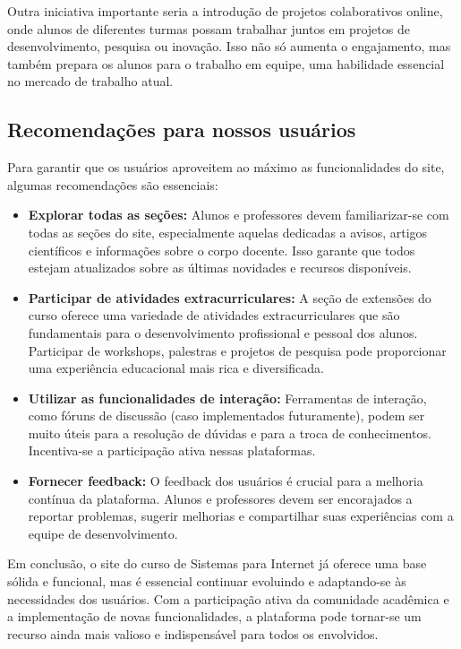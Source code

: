 \documentclass[a4paper,12pt]{report}
\begin{document}
Outra iniciativa importante seria a introdução de projetos colaborativos online, onde alunos de diferentes turmas possam trabalhar juntos em projetos de desenvolvimento, pesquisa ou inovação. Isso não só aumenta o engajamento, mas também prepara os alunos para o trabalho em equipe, uma habilidade essencial no mercado de trabalho atual. 

\subsection{Recomendações para nossos usuários} 
Para garantir que os usuários aproveitem ao máximo as funcionalidades do site, algumas recomendações são essenciais: 

\begin{itemize} 

    \item \textbf{Explorar todas as seções:} Alunos e professores devem familiarizar-se com todas as seções do site, especialmente aquelas dedicadas a avisos, artigos científicos e informações sobre o corpo docente. Isso garante que todos estejam atualizados sobre as últimas novidades e recursos disponíveis. 

    \item \textbf{Participar de atividades extracurriculares:} A seção de extensões do curso oferece uma variedade de atividades extracurriculares que são fundamentais para o desenvolvimento profissional e pessoal dos alunos. Participar de workshops, palestras e projetos de pesquisa pode proporcionar uma experiência educacional mais rica e diversificada. 

    \item \textbf{Utilizar as funcionalidades de interação:} Ferramentas de interação, como fóruns de discussão (caso implementados futuramente), podem ser muito úteis para a resolução de dúvidas e para a troca de conhecimentos. Incentiva-se a participação ativa nessas plataformas. 

    \item \textbf{Fornecer feedback:} O feedback dos usuários é crucial para a melhoria contínua da plataforma. Alunos e professores devem ser encorajados a reportar problemas, sugerir melhorias e compartilhar suas experiências com a equipe de desenvolvimento.

\end{itemize}

Em conclusão, o site do curso de Sistemas para Internet já oferece uma base sólida e funcional, mas é essencial continuar evoluindo e adaptando-se às necessidades dos usuários. Com a participação ativa da comunidade acadêmica e a implementação de novas funcionalidades, a plataforma pode tornar-se um recurso ainda mais valioso e indispensável para todos os envolvidos.
\end{document}
